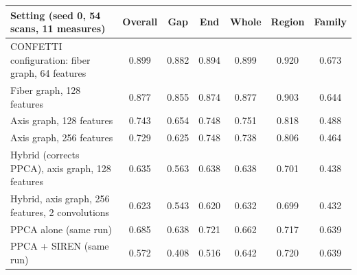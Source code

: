 \begin{tabular}{lcccccc}
\toprule
Setting (seed 0, 54 scans, 11 measures) & Overall & Gap & End & Whole & Region & Family \\
\midrule
CONFETTI configuration: fiber graph, 64 features & 0.899 & 0.882 & 0.894 & 0.899 & 0.920 & 0.673 \\
Fiber graph, 128 features & 0.877 & 0.855 & 0.874 & 0.877 & 0.903 & 0.644 \\
Axis graph, 128 features & 0.743 & 0.654 & 0.748 & 0.751 & 0.818 & 0.488 \\
Axis graph, 256 features & 0.729 & 0.625 & 0.748 & 0.738 & 0.806 & 0.464 \\
Hybrid (corrects PPCA), axis graph, 128 features & 0.635 & 0.563 & 0.638 & 0.638 & 0.701 & 0.438 \\
Hybrid, axis graph, 256 features, 2 convolutions & 0.623 & 0.543 & 0.620 & 0.632 & 0.699 & 0.432 \\
PPCA alone (same run) & 0.685 & 0.638 & 0.721 & 0.662 & 0.717 & 0.639 \\
PPCA + SIREN (same run) & 0.572 & 0.408 & 0.516 & 0.642 & 0.720 & 0.639 \\
\bottomrule
\end{tabular}
